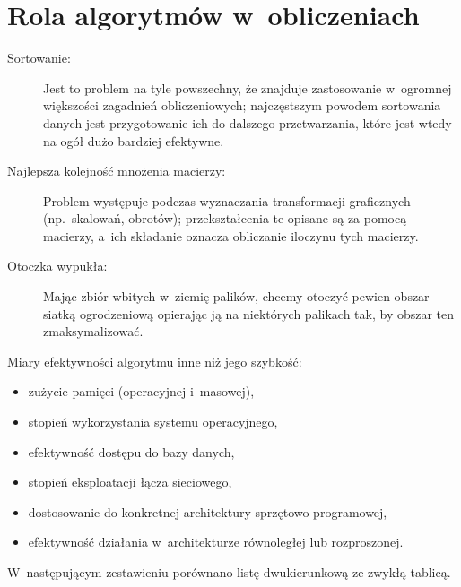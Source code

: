 \chapter{Rola algorytmów w~obliczeniach}


\exercise %
\begin{description}
	\item[Sortowanie:] Jest to problem na tyle powszechny, że znajduje zastosowanie w~ogromnej większości zagadnień obliczeniowych; najczęstszym powodem sortowania danych jest przygotowanie ich do dalszego przetwarzania, które jest wtedy na ogół dużo bardziej efektywne.
	\item[Najlepsza kolejność mnożenia macierzy:] Problem występuje podczas wyznaczania transformacji graficznych (np.\ skalowań, obrotów); przekształcenia te opisane są za pomocą macierzy, a~ich składanie oznacza obliczanie iloczynu tych macierzy.
	\item[Otoczka wypukła:] Mając zbiór wbitych w~ziemię palików, chcemy otoczyć pewien obszar siatką ogrodzeniową opierając ją na niektórych palikach tak, by obszar ten zmaksymalizować.
\end{description}

\exercise %
Miary efektywności algorytmu inne niż jego szybkość:
\begin{itemize}
	\item zużycie pamięci (operacyjnej i~masowej),
	\item stopień wykorzystania systemu operacyjnego,
	\item efektywność dostępu do bazy danych,
	\item stopień eksploatacji łącza sieciowego,
	\item dostosowanie do konkretnej architektury sprzętowo-programowej,
	\item efektywność działania w~architekturze równoległej lub rozproszonej.
\end{itemize}

\exercise %
W~następującym zestawieniu porównano listę dwukierunkową ze zwykłą tablicą.

